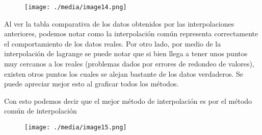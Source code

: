 \documentclass[12pt]{article}
\renewcommand{\_}{\kern-1.5pt\textunderscore\kern-1.5pt}
\begin{document}
\vspace{\baselineskip}



\begin{figure}[H]
	\begin{Center}
		\texttt{[image: ./media/image14.png]}
	\end{Center}
\end{figure}



\par

\begin{adjustwidth}{0.49in}{0.0in}
Al ver la tabla comparativa de los datos obtenidos por las interpolaciones anteriores, podemos notar como la interpolación común representa correctamente el comportamiento de los datos reales. Por otro lado, por medio de la interpolación de lagrange se puede notar que si bien llega a tener unos puntos muy cercanos a los reales (problemas dados por errores de redondeo de valores), existen otros puntos los cuales se alejan bastante de los datos verdaderos. Se puede apreciar mejor esto al graﬁcar todos los métodos.\par

\end{adjustwidth}

\begin{adjustwidth}{0.49in}{0.0in}
Con esto podemos decir que el mejor método de interpolación es por el método común de interpolación\par

\end{adjustwidth}


\vspace{\baselineskip}



\begin{figure}[H]
	\begin{Center}
		\texttt{[image: ./media/image15.png]}
	\end{Center}
\end{figure}



\par


\printbibliography
\end{document}
